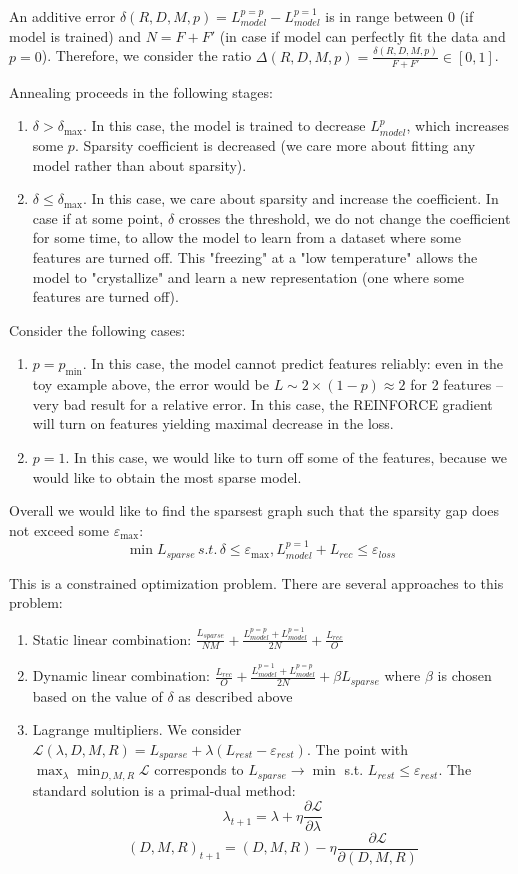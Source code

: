 \documentclass[a4paper,11pt,oneside]{report}
\begin{document}
An additive error $\delta(R, D, M, p)=L_{model}^{p=p}-L_{model}^{p=1}$ is in range between $0$ (if model is trained) and $N=F+F'$ (in case if model can perfectly fit the data and $p=0$). Therefore, we consider the ratio $\Delta(R, D, M, p)=\frac{\delta(R, D, M, p)}{F+F'}\in[0, 1]$.

Annealing proceeds in the following stages:
\begin{enumerate}
    \item $\delta>\delta_{\max}$. In this case, the model is trained to decrease $L_{model}^p$, which increases some $p$. Sparsity coefficient is decreased (we care more about fitting any model rather than about sparsity).
    \item $\delta\leq \delta_{\max}$. In this case, we care about sparsity and increase the coefficient. In case if at some point, $\delta$ crosses the threshold, we do not change the coefficient for some time, to allow the model to learn from a dataset where some features are turned off. This "freezing" at a "low temperature" allows the model to "crystallize" and learn a new representation (one where some features are turned off).
\end{enumerate}

Consider the following cases:
\begin{enumerate}
    \item $p=p_{\min}$. In this case, the model cannot predict features reliably: even in the toy example above, the error would be $L\sim 2\times (1-p)\approx 2$ for 2 features -- very bad result for a relative error. In this case, the REINFORCE gradient will turn on features yielding maximal decrease in the loss.
    \item $p=1$. In this case, we would like to turn off some of the features, because we would like to obtain the most sparse model.
\end{enumerate}

Overall we would like to find the sparsest graph such that the sparsity gap does not exceed some $\varepsilon_{\max}$:
$$
\min L_{sparse}\,s.t.\,\delta\leq \varepsilon_{\max},L_{model}^{p=1}+L_{rec}\leq \varepsilon_{loss}
$$

This is a constrained optimization problem. There are several approaches to this problem:
\begin{enumerate}
    \item Static linear combination: $\frac{L_{sparse}}{NM}+\frac{L_{model}^{p=p}+L_{model}^{p=1}}{2N}+\frac{L_{rec}}{O}$
    \item Dynamic linear combination: $\frac{L_{rec}}{O}+\frac{L_{model}^{p=1}+L_{model}^{p=p}}{2N}+\beta L_{sparse}$ where $\beta$ is chosen based on the value of $\delta$ as described above
    \item Lagrange multipliers. We consider $\mathcal L(\lambda, D, M, R)=L_{sparse}+\lambda (L_{rest}-\varepsilon_{rest})$. The point with $\max_{\lambda}\min_{D, M, R}\mathcal L$ corresponds to $L_{sparse}\to\min$ s.t. $L_{rest}\leq\varepsilon_{rest}$. The standard solution is a primal-dual method:
    $$\lambda_{t+1}=\lambda+\eta\frac{\partial \mathcal L}{\partial \lambda}$$
    $$(D, M,R)_{t+1}=(D,M,R)-\eta\frac{\partial\mathcal L}{\partial (D, M, R)}$$
\end{enumerate}
\end{document}

